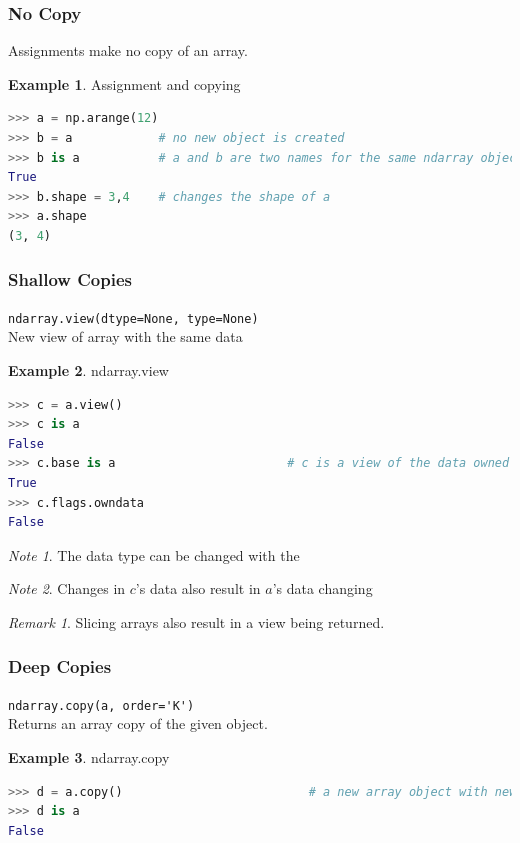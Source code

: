 \documentclass{article}
\theoremstyle{definition}
\newtheorem{ex}{Example}[subsection]
\theoremstyle{remark}
\newtheorem*{rem}{Remark}
\newtheorem*{nb}{Note}
\newcommand{\func}[2]{\noindent\lstinline{#1}\\#2}
\begin{document}
\subsubsection{No Copy}

Assignments make no copy of an array. 

\begin{ex} Assignment and copying
\begin{lstlisting}[language=Python]
>>> a = np.arange(12)
>>> b = a            # no new object is created
>>> b is a           # a and b are two names for the same ndarray object
True
>>> b.shape = 3,4    # changes the shape of a
>>> a.shape
(3, 4)
\end{lstlisting}
\end{ex}


\subsubsection{Shallow Copies}

\func{ndarray.view(dtype=None, type=None)}{New view of array with the same data}

\begin{ex} ndarray.view
\begin{lstlisting}[language=Python]
>>> c = a.view()
>>> c is a
False
>>> c.base is a                        # c is a view of the data owned by a
True
>>> c.flags.owndata
False
\end{lstlisting}
\begin{nb}
The data type can be changed with the 
\end{nb}

\begin{nb}
Changes in $ c $'s data also result in $ a $'s data changing
\end{nb}
\end{ex}

\begin{rem}
Slicing arrays also result in a view being returned.
\end{rem}

\subsubsection{Deep Copies}

\func{ndarray.copy(a, order='K')}{Returns an array copy of the given object.}

\begin{ex} ndarray.copy
\begin{lstlisting}[language=Python]
>>> d = a.copy()                          # a new array object with new data is created
>>> d is a
False
\end{lstlisting}
\end{ex}
\end{document}

